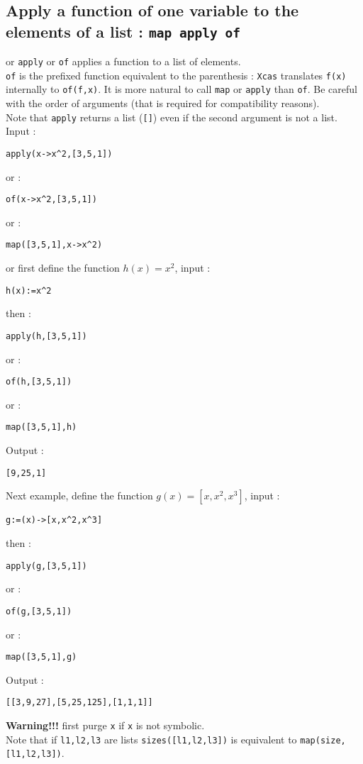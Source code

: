 \documentclass[a4paper,11pt]{book}
\begin{document}
\subsection{Apply a function of one variable to the elements of a list : {\tt map apply of}}
 or  {\tt apply} or {\tt of} applies a function to a list
of elements.\\
{\tt of} is the prefixed function equivalent to the parenthesis  : 
{\tt Xcas} translates {\tt f(x)} internally to {\tt of(f,x)}. 
It is more natural to call {\tt map} 
or {\tt apply} than {\tt of}. Be careful with the order of arguments
(that is required for compatibility reasons).\\
Note that {\tt apply} returns a list ({\tt []})
even if the second argument is not a list.\\
Input :
\begin{center}{\tt apply(x->x\verb|^|2,[3,5,1])}\end{center}
or :
\begin{center}{\tt of(x->x\verb|^|2,[3,5,1])}\end{center}
or :
\begin{center}{\tt map([3,5,1],x->x\verb|^|2)}\end{center}
or first define the function $h(x)=x^2$, input :
\begin{center}{\tt h(x):=x\verb|^|2}\end{center}
then :
\begin{center}{\tt apply(h,[3,5,1])}\end{center}
or :
\begin{center}{\tt of(h,[3,5,1])}\end{center}
or :
\begin{center}{\tt map([3,5,1],h)}\end{center}
Output :
\begin{center}{\tt   [9,25,1]}\end{center}
Next example, define the function $g(x)=[x,x^2,x^3]$, input :
\begin{center}{\tt g:=(x)->[x,x\verb|^|2,x\verb|^|3]}\end{center}
then :
\begin{center}{\tt apply(g,[3,5,1])}\end{center}
or :
\begin{center}{\tt of(g,[3,5,1])}\end{center}
or :
\begin{center}{\tt map([3,5,1],g)}\end{center}
Output :
\begin{center}{\tt   [[3,9,27],[5,25,125],[1,1,1]]}\end{center}
{\bf Warning!!!} first purge {\tt x} if {\tt x} is not symbolic.\\
Note that if {\tt l1,l2,l3} are lists
{\tt sizes([l1,l2,l3])} is equivalent to {\tt map(size,[l1,l2,l3])}.
\end{document}
